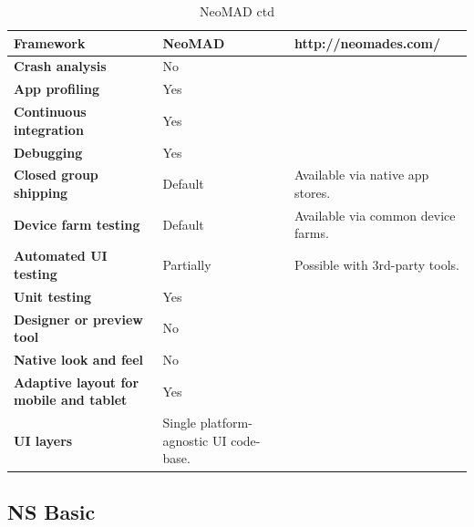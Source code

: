 \documentclass[english,master,public,dept460,male,cpdeclaration,oneside]{diploma}
\begin{document}
\begin{table}[!h]
	\centering
	\caption{NeoMAD ctd}
	\begin{tabular}{p{} | p{} | p{}}
		\toprule		
		\textbf{Framework} & \textbf{NeoMAD} & http://neomades.com/ \\
		\midrule
		\textbf{Crash analysis} & No & \\			
		\midrule
		\textbf{App profiling} & Yes & \\			
		\midrule
		\textbf{Continuous integration} & Yes & \\			
		\midrule
		\textbf{Debugging} & Yes & \\			
		\midrule
		\textbf{Closed group shipping} & Default & Available via native app stores. \\			
		\midrule
		\textbf{Device farm testing} & Default & Available via common device farms. \\			
		\midrule
		\textbf{Automated UI testing} & Partially & Possible with 3rd-party tools. \\			
		\midrule
		\textbf{Unit testing} & Yes & \\			
		\midrule
		\textbf{Designer or preview tool} & No & \\			
		\midrule
		\textbf{Native look and feel} & No & \\			
		\midrule
		\textbf{Adaptive layout for mobile and tablet} & Yes & \\			
		\midrule		
		\textbf{UI layers} & Single platform-agnostic UI code-base. &  \\			
		\midrule
	\end{tabular}
\end{table}

\clearpage
\subsection{NS Basic}
\end{document}
